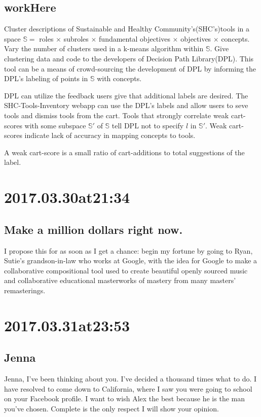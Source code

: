 \begin{enumerate}
\begin{enumerate}
\subsection*{ workHere }
Cluster descriptions of Sustainable and Healthy Community's(SHC's)tools in a space $\mathbb{S}=$ roles $\times$ subroles $\times$ fundamental objectives $\times$ objectives $\times$ concepts.
Vary the number of clusters used in a k-means algorithm within $\mathbb{S}$.
Give clustering data and code to the developers of Decision Path Library(DPL).
This tool can be a means of crowd-sourcing the development of DPL by informing the DPL's labeling of points in $\mathbb{S}$ with concepts.

DPL can utilize the feedback users give that additional labels are desired.
The SHC-Tools-Inventory webapp can use the DPL's labels and allow users to seve tools and dismiss tools from the cart.
Tools that strongly correlate weak cart-scores with some subspace $\mathbb{S}'$ of $\mathbb{S}$ tell DPL not to specify $l$ in $\mathbb{S}'$.
Weak cart-scores indicate lack of accuracy in mapping concepts to tools. 

A weak cart-score is a small ratio of cart-additions to total suggestions of the label.

\section*{ 2017.03.30at21:34 }
\subsection*{ Make a million dollars right now. }
I propose this for as soon as I get a chance: begin my fortune by going to Ryan, Sutie's grandson-in-law who works at Google, with the idea for Google to make a collaborative compositional tool used to create beautiful openly sourced music and collaborative educational masterworks of mastery from many masters' remasterings.

\section*{ 2017.03.31at23:53 }
\subsection*{ Jenna }
Jenna, I've been thinking about you.
I've decided a thousand times what to do.
I have resolved to come down to California, where I saw you were going to school on your Facebook profile.
I want to wish Alex the best because he is the man you've chosen.
Complete is the only respect I will show your opinion.


\end{enumerate}
\end{enumerate}
